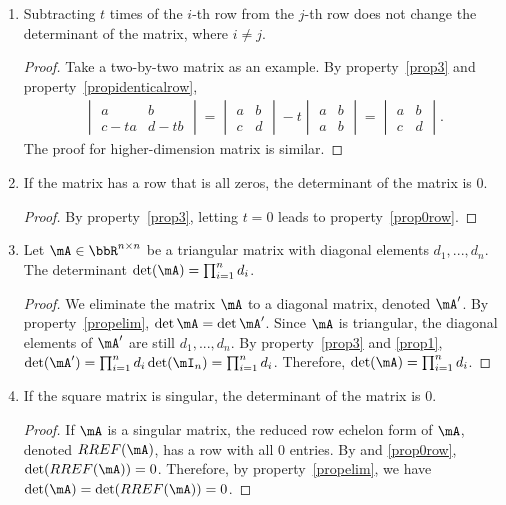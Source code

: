 \documentclass[11pt]{article}
\theoremstyle{plain}
\theoremstyle{definition}
\begin{document}
\begin{enumerate}
	\item \label{propelim} Subtracting $t$ times of the $i$-th row from the $j$-th row does not change the determinant of the matrix, where $i \neq j$.
	\begin{proof}
		Take a two-by-two matrix as an example. By property~\ref{prop3} and property~\ref{propidenticalrow}, 
	\begin{align}
		 \begin{vmatrix}
			a & b \\ c - ta&d -tb
		\end{vmatrix} = \begin{vmatrix}
			a & b \\ c &d
		\end{vmatrix} -t \begin{vmatrix}
			a & b \\ a& b
		\end{vmatrix}  = \begin{vmatrix}
			a & b \\ c &d
		\end{vmatrix}.
	\end{align}
	The proof for higher-dimension matrix is similar.
	\end{proof}
	
	\item\label{prop0row} If the matrix has a row that is all zeros, the determinant of the matrix is 0.
	\begin{proof}
		By property~\ref{prop3}, letting $t = 0$ leads to property~\ref{prop0row}.
	\end{proof}

	
	\item\label{propdiag} Let $\mA \in \bbR^{n \times n}$ be a triangular matrix with diagonal elements $d_1,...,d_n$. The determinant $\det(\mA) = \prod_{i = 1}^n d_i$. 
	\begin{proof}
	We eliminate the matrix $\mA$ to a diagonal matrix, denoted $\mA'$. By property~\ref{propelim}, $\det{\mA} = \det{\mA'}$. Since $\mA$ is triangular, the diagonal elements of $\mA'$ are still $d_1,...,d_n$.
 		 By property~\ref{prop3} and \ref{prop1}, $\det(\mA') = \prod_{i = 1}^n d_i\det(\mI_n) =\prod_{i = 1}^n d_i$. Therefore, $\det(\mA) = \prod_{i = 1}^n d_i$.
	\end{proof}

	
	\item\label{propsingular} If the square matrix is singular, the determinant of the matrix is 0.
	
	\begin{proof}
		If $\mA$ is a singular matrix, the reduced row echelon form of $\mA$, denoted $RREF(\mA)$, has a row with all 0 entries. By and \ref{prop0row}, $\det(RREF(\mA)) = 0$. Therefore, by property~\ref{propelim}, we have $\det(\mA) =\det(RREF(\mA)) =  0$. 
	\end{proof}


\end{enumerate}
\end{document}
